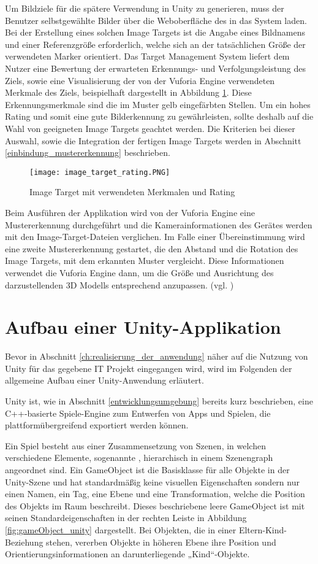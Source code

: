 Um Bildziele für die spätere Verwendung in Unity zu generieren, muss der Benutzer selbstgewählte Bilder über die Weboberfläche des  in das System laden.
Bei der Erstellung eines solchen Image Targets ist die Angabe eines Bildnamens und einer Referenzgröße erforderlich, welche sich an der tatsächlichen Größe der verwendeten Marker orientiert.
Das Target Management System liefert dem Nutzer eine Bewertung der erwarteten Erkennungs- und Verfolgungsleistung des Ziels, sowie eine Visualisierung der von der Vuforia Engine verwendeten Merkmale des Ziels, beispielhaft dargestellt in Abbildung \ref{fig:image_target_rating}. 
Diese Erkennungsmerkmale sind die im Muster gelb eingefärbten Stellen.
Um ein hohes Rating und somit eine gute Bilderkennung zu gewährleisten, sollte deshalb auf die Wahl von geeigneten Image Targets geachtet werden.
Die Kriterien bei dieser Auswahl, sowie die Integration der fertigen Image Targets werden in Abschnitt \ref{einbindung_mustererkennung} beschrieben.

\begin{figure} [h]
\centering
\texttt{[image: image\_target\_rating.PNG]}
\caption{Image Target mit verwendeten Merkmalen und Rating}
\label{fig:image_target_rating}
\end{figure}

Beim Ausführen der Applikation wird von der Vuforia Engine eine Mustererkennung durchgeführt und die Kamerainformationen des Gerätes werden mit den Image-Target-Dateien verglichen. 
Im Falle einer Übereinstimmung wird eine zweite Mustererkennung gestartet, die den Abstand und die Rotation des Image Targets, mit dem erkannten Muster vergleicht.
Diese Informationen verwendet die Vuforia Engine dann, um die Größe und Ausrichtung des darzustellenden 3D Modells entsprechend anzupassen. (vgl. \cite{Grahn2017})
\section{Aufbau einer Unity-Applikation}
Bevor in Abschnitt \ref{ch:realisierung_der_anwendung} näher auf die Nutzung von Unity für das gegebene IT Projekt eingegangen wird, wird im Folgenden der allgemeine Aufbau einer Unity-Anwendung erläutert. 

Unity ist, wie in Abschnitt \ref{entwicklungsumgebung} bereits kurz beschrieben, eine C++-basierte Spiele-Engine zum Entwerfen von Apps und Spielen, die plattformübergreifend exportiert werden können.

Ein Spiel besteht aus einer Zusammensetzung von Szenen, in welchen verschiedene Elemente, sogenannte , hierarchisch in einem Szenengraph angeordnet sind. 
Ein GameObject ist die Basisklasse für alle Objekte in der Unity-Szene und hat standardmäßig keine visuellen Eigenschaften sondern nur einen Namen, ein Tag, eine Ebene und eine Transformation, welche die Position des Objekts im Raum beschreibt.
Dieses beschriebene leere GameObject ist mit seinen Standardeigenschaften in der rechten Leiste in Abbildung \ref{fig:gameObject_unity} dargestellt.
Bei Objekten, die in einer Eltern-Kind-Beziehung stehen, vererben Objekte in höheren Ebene ihre Position und Orientierungsinformationen an darunterliegende „Kind“-Objekte.

